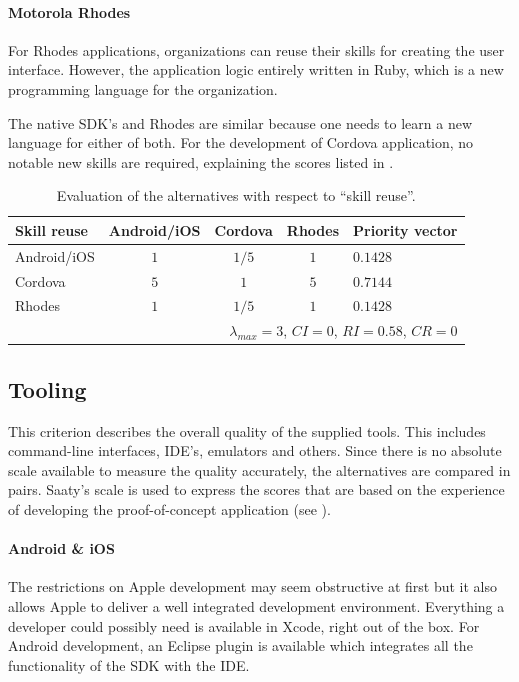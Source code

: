 \paragraph{Motorola Rhodes} For Rhodes applications, organizations can reuse their skills for creating the user interface. However, the application logic entirely written in Ruby, which is a new programming language for the organization.

The native SDK's and Rhodes are similar because one needs to learn a new language for either of both. For the development of Cordova application, no notable new skills are required, explaining the scores listed in .

\begin{table}[h!]
    \centering
    \begin{tabular}{lcccl}
        \hline
        \textbf{Skill reuse} & Android/iOS & Cordova & Rhodes & Priority vector \\
        \hline
        Android/iOS          & $1$         & $1/5$   & $1$    & $0.1428$        \\
        Cordova              & $5$         & $1$     & $5$    & $0.7144$        \\
        Rhodes               & $1$         & $1/5$   & $1$    & $0.1428$        \\
        \hline
        \multicolumn{5}{r}{$\lambda_{max} = 3$, $CI = 0$, $RI = 0.58$, $CR = 0$}\\
        \hline
    \end{tabular}
    \caption{Evaluation of the alternatives with respect to ``skill reuse''.}
    \label{tab:sr}
\end{table}

\subsection{Tooling}

This criterion describes the overall quality of the supplied tools. This includes command-line interfaces, IDE's, emulators and others. Since there is no absolute scale available to measure the quality accurately, the alternatives are compared in pairs. Saaty's scale is used to express the scores that are based on the experience of developing the proof-of-concept application (see ).

\paragraph{Android \& iOS} The restrictions on Apple development may seem obstructive at first but it also allows Apple to deliver a well integrated development environment. Everything a developer could possibly need is available in Xcode, right out of the box. For Android development, an Eclipse plugin is available which integrates all the functionality of the SDK with the IDE. 

